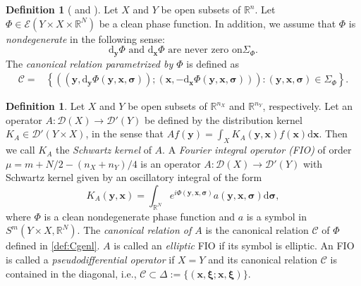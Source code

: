 \documentclass[a4paper,12pt]{amsart}
\numberwithin{equation}{section}
\theoremstyle{plain}
\numberwithin{theorem}{section}
\theoremstyle{definition}
\newtheorem{definition}[theorem]{Definition}
\theoremstyle{remark}
\theoremstyle{remark}
\theoremstyle{remark}
\newcommand{\smo}{\setminus \mathbf{0}}
\newcommand{\paren}[1]{\left(#1\right)}               %
\newcommand{\sparen}[1]{\left\{#1\right\}}      %
\newcommand{\dd}{\mathrm{d}}  %
\newcommand{\Cc}{\mathcal{C}}
\newcommand{\Dc}{\mathcal{D}}
\newcommand{\Ec}{\mathcal{E}}
\newcommand{\vx}{{\mathbf{x}}}
\newcommand{\vy}{{\mathbf{y}}}
\newcommand{\vs}{\mathbf{s}}
\newcommand{\vxi}{{\boldsymbol{\xi}}}
\newcommand{\vsig}{{\boldsymbol{\sigma}}} %
\newcommand{\rr}{{{\mathbb R}}}
\newcommand{\rn}{{{\mathbb R}^n}}
\begin{document}
\begin{definition}[{\cite[Definition 21.2.15]{hormanderIII} and
      \cite[section 25.2]{hormander}}]\label{def:canon} Let $X$ and
$Y$ be open subsets of $\rn$. Let $\Phi\in \Ec\paren{Y \times X \times
{\rr}^N}$ be a clean phase function.  In addition, we assume that
$\Phi$ is \emph{nondegenerate} in the following sense:
\[\text{$\dd_{\vy}\Phi$ and $\dd_{\vx}\Phi$ are never zero on
$\Sigma_{\Phi}$.}\]
  The
\emph{canonical relation parametrized by $\Phi$} is defined as
\begin{equation}\label{def:Cgenl} \begin{aligned} \Cc=&\sparen{
\paren{\paren{\vy,\dd_{\vy}\Phi(\vy,\vx,\vsig)};\paren{\vx,-\dd_{\vx}\Phi(\vy,\vx,\vsig)}}:(\vy,\vx,\vsig)\in
\Sigma_{\Phi}}{.}
\end{aligned}
\end{equation}
\end{definition}



\begin{definition}\label{FIOdef}
Let $X$ and $Y$ be open subsets of {$\mathbb{R}^{n_X}$ and $\mathbb{R}^{n_Y}$, respectively.} {Let an operator $A :
\Dc(X)\to \mathcal{D}'(Y)$ be defined by the distribution kernel
$K_A\in \mathcal{D}'(Y\times X)$, in the sense that
$Af(\vy)=\int_{X}K_A(\vy,\vx)f(\vx)\mathrm{d}\vx$. Then we call $K_A$
the \emph{Schwartz kernel} of $A$}. A \emph{Fourier
integral operator (FIO)} of order $\mu = m + N/2 - (n_X+n_Y)/4$ is an operator
$A:\Dc(X)\to \mathcal{D}'(Y)$ with Schwartz kernel given by an
oscillatory integral of the form
\begin{equation} \label{oscint}
K_A(\vy,\vx)=\int_{\mathbb{R}^N}
e^{i\Phi(\vy,\vx,\vsig)}a(\vy,\vx,\vsig) \mathrm{d}\vsig,
\end{equation}
where $\Phi$ is a clean nondegenerate phase function and $a$ is a
symbol in $S^m(Y \times X , \mathbb{R}^N)$. The \emph{canonical
relation of $A$} is the canonical relation $\mathcal{C}$ of $\Phi$ defined in
\eqref{def:Cgenl}. $A$ is called an \emph{elliptic} FIO if its symbol is elliptic. An FIO is called a \emph{pseudodifferential operator} if {$X = Y$ and} its canonical relation $\Cc$ is contained in the diagonal, i.e.,
$\Cc \subset \Delta := \{ (\vx,\vxi;\vx,\vxi)\}$.
\end{definition}

\end{document}

